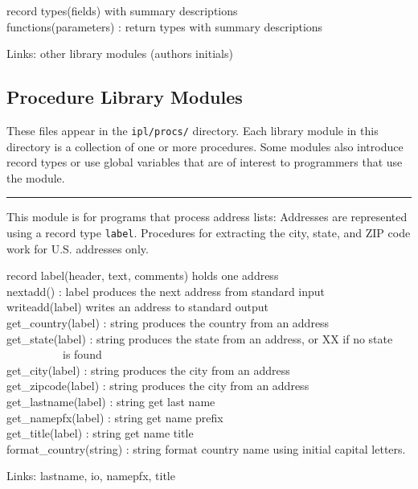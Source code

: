 record types(fields) with summary descriptions\\
functions(parameters) : return types with summary descriptions

Links: other library modules (author{\textquotesingle}s initials)

\subsection{Procedure Library Modules}

These files appear in the \texttt{ipl/procs/} directory. Each library
module in this directory is a collection of one or more procedures.
Some modules also introduce record types or use global variables that
are of interest to programmers that use the module.

\vspace{0.25cm}\hrule{}

This module is for programs that process address lists: Addresses are
represented using a record type \texttt{label}. Procedures for
extracting the city, state, and ZIP code work for U.S. addresses only.

\textsf{record label(header, text, comments)} holds one address\\
\textsf{nextadd() : label} produces the next address from standard
input\\
\textsf{writeadd(label)} writes an address to standard output\\
\textsf{get\_country(label) : string} produces the country from an
address\\
\textsf{get\_state(label) : string} produces the state from an address,
or \textsf{{\textquotedbl}XX{\textquotedbl}} if no state \\
\ \ \ \ \ \ \ \ \ \ is found\\
\textsf{get\_city(label) : string} produces the city from an address\\
\textsf{get\_zipcode(label) : string} produces the city from an address\\
\textsf{get\_lastname(label) : string} get last name\\
\textsf{get\_namepfx(label) : string} get name prefix\\
\textsf{get\_title(label) : string} get name title\\
\textsf{format\_country(string) : string} format country name using
initial capital letters.

Links: lastname, io, namepfx, title 

